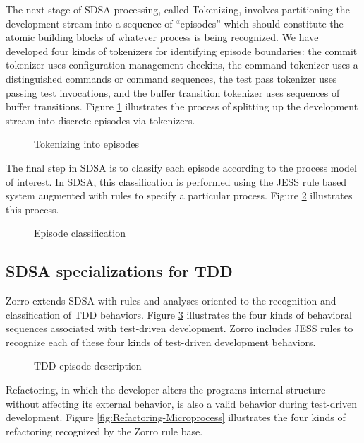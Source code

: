 \documentclass[runningheads]{llncs}
\begin{document}
The next stage of SDSA processing, called Tokenizing, involves partitioning the
development stream into a sequence of ``episodes'' which should constitute
the atomic building blocks of whatever process is being recognized.  We
have developed four kinds of tokenizers for identifying episode boundaries:
the commit tokenizer uses configuration management checkins, the command
tokenizer uses a distinguished commands or command sequences, the test pass
tokenizer uses passing test invocations, and the buffer transition
tokenizer uses sequences of buffer transitions.  Figure
\ref{fig:TokenizerChain} illustrates the process of splitting up the
development stream into discrete episodes via tokenizers.

\begin{figure}[t]
  \centering
  \caption{Tokenizing into episodes}
  \label{fig:TokenizerChain}
\end{figure} 

The final step in SDSA is to classify each episode according to the process
model of interest. In SDSA, this classification is performed using the JESS
rule based system augmented with rules to specify a particular
process. Figure \ref{fig:Classification} illustrates this process.

\begin{figure}[t] 
  \centering
  \caption{Episode classification}
  \label{fig:Classification}
\end{figure} 

\subsection{SDSA specializations for TDD}

Zorro extends SDSA with rules and analyses oriented to the recognition and
classification of TDD behaviors. 
Figure \ref{fig:TDD-Microprocess} illustrates the four kinds of 
behavioral sequences associated with test-driven development. Zorro includes JESS rules
to recognize each of these four kinds of test-driven development behaviors.

\begin{figure}[t] 
  \centering
  \caption{TDD episode description}
  \label{fig:TDD-Microprocess}
\end{figure} 

Refactoring, in which the developer alters the programs internal structure without affecting
its external behavior, is also a valid behavior during test-driven development.  Figure
\ref{fig:Refactoring-Microprocess} illustrates the four kinds of refactoring recognized by 
the Zorro rule base. 
\end{document}
